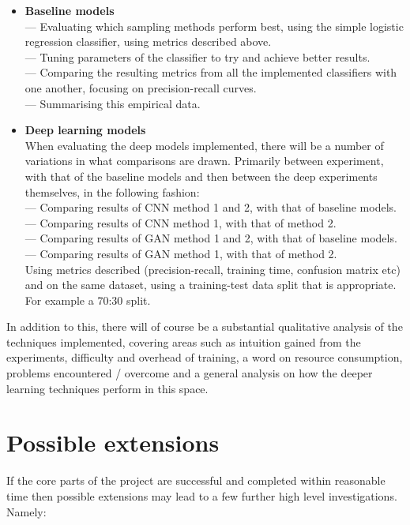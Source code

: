 \documentclass[12pt,a4paper,twoside]{article}
\begin{document}
\begin{itemize}
\item
	\textbf{ Baseline models }\\
	--- Evaluating which sampling methods perform best, using the simple logistic regression classifier, using metrics described above.\\
	--- Tuning parameters of the classifier to try and achieve better results.\\
	--- Comparing the resulting metrics from all the implemented classifiers with one another, focusing on precision-recall curves.\\
	--- Summarising this empirical data.
\item
	\textbf{Deep learning models }\\
	When evaluating the deep models implemented, there will be a number of variations in what comparisons are drawn. Primarily between experiment, with that of the baseline models and then between the deep experiments themselves, in the following fashion:\\
	--- Comparing results of CNN method 1 and 2, with that of baseline models.\\
	--- Comparing results of CNN method 1, with that of method 2.\\
	--- Comparing results of GAN method 1 and 2, with that of baseline models.\\
	--- Comparing results of GAN method 1, with that of method 2.\\
	
	Using metrics described (precision-recall, training time, confusion matrix etc) and on the same dataset, using a training-test data split that is appropriate. For example a 70:30 split. 
\end{itemize}
In addition to this, there will of course be a substantial qualitative analysis of the techniques implemented, covering areas such as intuition gained from the experiments, difficulty and overhead of training, a word on resource consumption, problems encountered / overcome and a general analysis on how the deeper learning techniques perform in this space.

\section*{Possible extensions}

If the core parts of the project are successful and completed within reasonable time then possible extensions may lead to a few further high level investigations. Namely:
\end{document}
